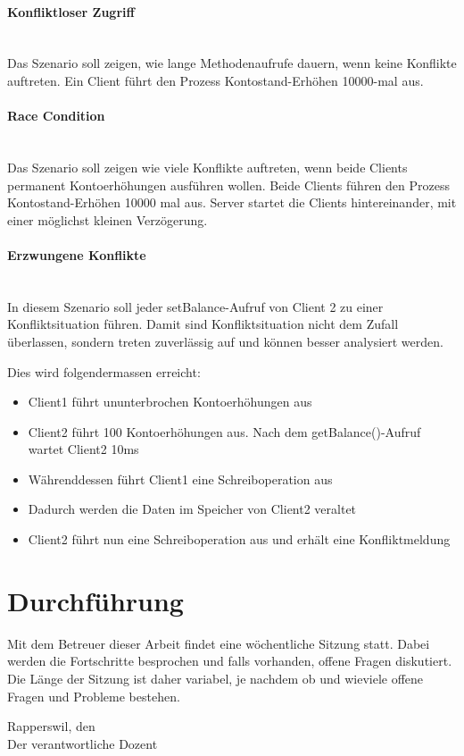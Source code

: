 \documentclass{article}
\begin{document}
\paragraph{Konfliktloser Zugriff}
\label{sec:konfl-zugr}
$~~$ \\
Das Szenario soll zeigen, wie lange Methodenaufrufe dauern, wenn keine Konflikte auftreten. Ein Client führt den Prozess Kontostand-Erhöhen 10000-mal aus.

\paragraph{Race Condition}
\label{sec:race-condition}
$~~$ \\
Das Szenario soll zeigen wie viele Konflikte auftreten, wenn beide Clients permanent Kontoerhöhungen ausführen wollen.
Beide Clients führen den Prozess Kontostand-Erhöhen 10000 mal aus. Server startet die Clients hintereinander, mit einer möglichst kleinen Verzögerung.

\paragraph{Erzwungene Konflikte}
\label{sec:erzwungene-konflikte}
$~~$ \\
In diesem Szenario soll jeder setBalance-Aufruf von Client 2 zu einer Konfliktsituation führen. Damit sind Konfliktsituation nicht dem Zufall überlassen, sondern treten zuverlässig auf und können besser analysiert werden.

Dies wird folgendermassen erreicht:
\begin{itemize}
\item Client1 führt ununterbrochen Kontoerhöhungen aus
\item Client2 führt 100 Kontoerhöhungen aus. Nach dem getBalance()-Aufruf wartet Client2 10ms
\item Währenddessen führt Client1 eine Schreiboperation aus
\item Dadurch werden die Daten im Speicher von Client2 veraltet
\item Client2 führt nun eine Schreiboperation aus und erhält eine Konfliktmeldung
\end{itemize}

\section{Durchführung}
Mit dem Betreuer dieser Arbeit findet eine wöchentliche Sitzung statt. Dabei werden die Fortschritte besprochen und falls vorhanden, offene Fragen diskutiert. Die Länge der Sitzung ist daher variabel, je nachdem ob und wieviele offene Fragen und Probleme bestehen.


\vspace{1cm}

\noindent Rapperswil, den\\
Der verantwortliche Dozent\\
\end{document}
